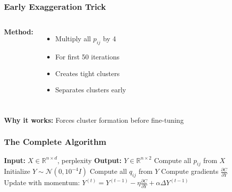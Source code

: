 \documentclass[aspectratio=169]{beamer}
\begin{document}
\begin{frame}
\frametitle{Early Exaggeration Trick}

\begin{columns}
\textbf{Method:}
\begin{itemize}
\item Multiply all $p_{ij}$ by 4
\item For first 50 iterations
\item Creates tight clusters
\item Separates clusters early
\end{itemize}

\end{columns}

\vspace{0.3cm}
\textbf{Why it works:} Forces cluster formation before fine-tuning

\end{frame}

\begin{frame}
\frametitle{The Complete Algorithm}

\begin{algorithmic}[1]
\State \textbf{Input:} $X \in \mathbb{R}^{n \times d}$, perplexity
\State \textbf{Output:} $Y \in \mathbb{R}^{n \times 2}$
  \State
\State Compute all $p_{ij}$ from $X$
  \State Initialize $Y \sim \mathcal{N}(0, 10^{-4}I)$
  \State
{}
\State Compute all $q_{ij}$ from $Y$
  \State Compute gradients $\frac{\partial C}{\partial Y}$
  \State Update with momentum:
  \State \quad $Y^{(t)} = Y^{(t-1)} - \eta \frac{\partial C}{\partial Y} + \alpha \Delta Y^{(t-1)}$
  \EndFor
\end{algorithmic}

\end{frame}
\end{document}
